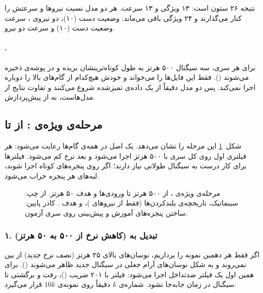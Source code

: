 نتیجه ۲۶ ستون است: ۱۳ ویژگی و ۱۳ سرعت. هر دو مدل نسبت نیروها و سرعتش را کنار می‌گذارند و ۲۴ ویژگی باقی می‌ماند: وضعیت دست (۱۰)، دو نیروی ، سرعت وضعیت دست (۱۰) و سرعت دو نیرو.

\paragraph{.} برای هر سری، سه سیگنال ۵۰۰ هرتز به طول کوتاه‌ترینشان بریده و در پوشه‌ی  ذخیره می‌شوند ().  فقط این فایل‌ها را می‌خواند و خودش هیچ‌کدام از گام‌های بالا را دوباره اجرا نمی‌کند. پس دو مدل دقیقاً از یک داده‌ی تمیزشده شروع می‌کنند و تفاوت نتایج از مدل‌هاست، نه از پیش‌پردازش.

\subsection{مرحله‌ی ویژه‌ی : از  تا }
\label{sec:preproc-v2}

شکل~\ref{fig:preproc-v2} این مرحله را نشان می‌دهد. یک اصل در همه‌ی گام‌ها رعایت می‌شود: هر فیلتری اول روی کل سری با ۵۰۰ هرتز اجرا می‌شود و بعد نرخ کم می‌شود. فیلترها برای کار درست به سیگنال طولانی نیاز دارند؛ اگر روی پنجره‌های کوتاه اجرا شوند، لبه‌های هر پنجره خراب می‌شود.

\begin{figure}[p]
\centering
\resizebox{\textwidth}{!}{}
\caption{مرحله‌ی ویژه‌ی ، از  ۵۰۰ هرتز تا ورودی‌ها و هدف ۵۰ هرتز. از چپ: سینماتیک، تاریخچه‌ی بلندکردن‌ها (فقط از نیروهای )،   و هدف . کادر پایین: ساختن پنجره‌های آموزش و پیش‌بینی روی سری آزمون.}
\label{fig:preproc-v2}
\end{figure}

\subsubsection*{۱. تبدیل به  (کاهش نرخ از ۵۰۰ به ۵۰ هرتز)}
اگر فقط هر دهمین نمونه را برداریم، نوسان‌های بالای ۲۵ هرتز (نصف نرخ جدید) از بین نمی‌روند و به شکل نوسان‌های آرام جعلی در سیگنال جدید ظاهر می‌شوند (). برای همین اول یک فیلتر ضدتداخل اجرا می‌شود: فیلتر  با ۲۰۱ ضریب ()، رفت و برگشتی تا سیگنال در زمان جابه‌جا نشود.  شماره‌ی $k$ دقیقاً روی نمونه‌ی $10k$ قرار می‌گیرد.

